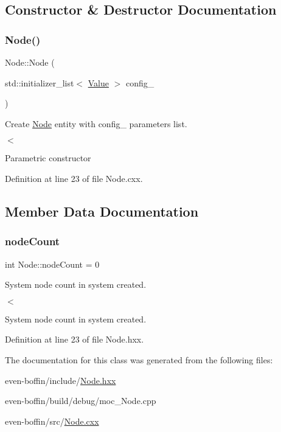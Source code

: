 \subsection{Constructor \& Destructor Documentation}
\mbox{\label{classeven_1_1_node_aca2546b6c444b3d774339e7b1fa17b8a}} 
\subsubsection{\texorpdfstring{Node()}{Node()}}
{\footnotesize\ttfamily Node\+::\+Node (\begin{DoxyParamCaption}\item[{std\+::initializer\+\_\+list$<$ \mbox{\hyperlink{classeven_1_1_value}{Value}} $>$}]{config\+\_\+ }\end{DoxyParamCaption})}



Create \mbox{\hyperlink{classeven_1_1_node}{Node}} entity with config\+\_\+ parameters list. 

$<$

Parametric constructor 

Definition at line 23 of file Node.\+cxx.



\subsection{Member Data Documentation}
\mbox{\label{classeven_1_1_node_a5497ed023382d8e370ad72d758587927}} 
\subsubsection{\texorpdfstring{node\+Count}{nodeCount}}
{\footnotesize\ttfamily int Node\+::node\+Count = 0\hspace{0.3cm}{\ttfamily [static]}}



System node count in system created. 

$<$

System node count in system created. 

Definition at line 23 of file Node.\+hxx.



The documentation for this class was generated from the following files\+:\begin{DoxyCompactItemize}
\item 
even-\/boffin/include/\mbox{\hyperlink{_node_8hxx}{Node.\+hxx}}\item 
even-\/boffin/build/debug/moc\+\_\+\+Node.\+cpp\item 
even-\/boffin/src/\mbox{\hyperlink{_node_8cxx}{Node.\+cxx}}\end{DoxyCompactItemize}
